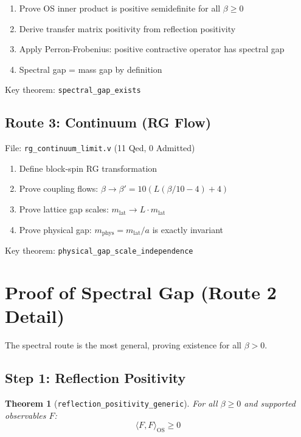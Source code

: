 \documentclass[11pt, a4paper]{article}
\newtheorem{theorem}{Theorem}
\begin{document}
\begin{enumerate}
    \item Prove OS inner product is positive semidefinite for all $\beta \geq 0$
    \item Derive transfer matrix positivity from reflection positivity
    \item Apply Perron-Frobenius: positive contractive operator has spectral gap
    \item Spectral gap = mass gap by definition
\end{enumerate}

Key theorem: \texttt{spectral\_gap\_exists}

\subsection{Route 3: Continuum (RG Flow)}

File: \texttt{rg\_continuum\_limit.v} (11 Qed, 0 Admitted)

\begin{enumerate}
    \item Define block-spin RG transformation
    \item Prove coupling flows: $\beta \to \beta' = 10(L(\beta/10 - 4) + 4)$
    \item Prove lattice gap scales: $m_{\text{lat}} \to L \cdot m_{\text{lat}}$
    \item Prove physical gap: $m_{\text{phys}} = m_{\text{lat}}/a$ is exactly invariant
\end{enumerate}

Key theorem: \texttt{physical\_gap\_scale\_independence}

\section{Proof of Spectral Gap (Route 2 Detail)}

The spectral route is the most general, proving existence for all $\beta > 0$.

\subsection{Step 1: Reflection Positivity}

\begin{theorem}[\texttt{reflection\_positivity\_generic}]
For all $\beta \geq 0$ and supported observables $F$:
\begin{equation}
    \langle F, F \rangle_{\text{OS}} \geq 0
\end{equation}
\end{theorem}
\end{document}
